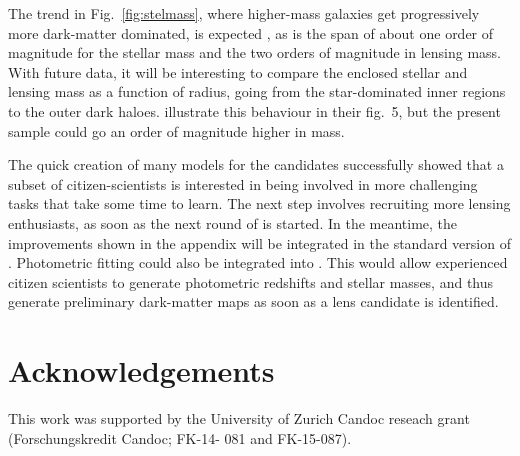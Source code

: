 The trend in Fig.~\ref{fig:stelmass}, where higher-mass galaxies get
progressively more dark-matter dominated, is expected
\citep[see e.g.][]{2005ApJ...623L...5F}, as is the span of about one
order of magnitude for the stellar mass and the two orders of
magnitude in lensing mass. With future data, it will be interesting to
compare the enclosed stellar and lensing mass as a function of radius,
going from the star-dominated inner regions to the outer dark
haloes. \citet{2011ApJ...740...97L} illustrate this behaviour in their
fig.~5, but the present sample could go an order of magnitude higher
in mass.

The quick creation of many models for the {\SW} candidates
successfully showed that a subset of citizen-scientists is interested
in being involved in more challenging tasks that take some time to
learn. The next step involves recruiting more lensing enthusiasts, as
soon as the next round of {\SW} is started. In the meantime, the
improvements shown in the appendix will be integrated in the standard
version of {\SpL}. Photometric fitting could also be
integrated into {\SpL}. This would allow experienced citizen
scientists to generate photometric redshifts and stellar masses, and
thus generate preliminary dark-matter maps as soon as a lens candidate
is identified.



\section{Acknowledgements}\label{sec:ack}
This work was supported by the University of Zurich
Candoc reseach grant (Forschungskredit Candoc; FK-14-
081 and FK-15-087).

